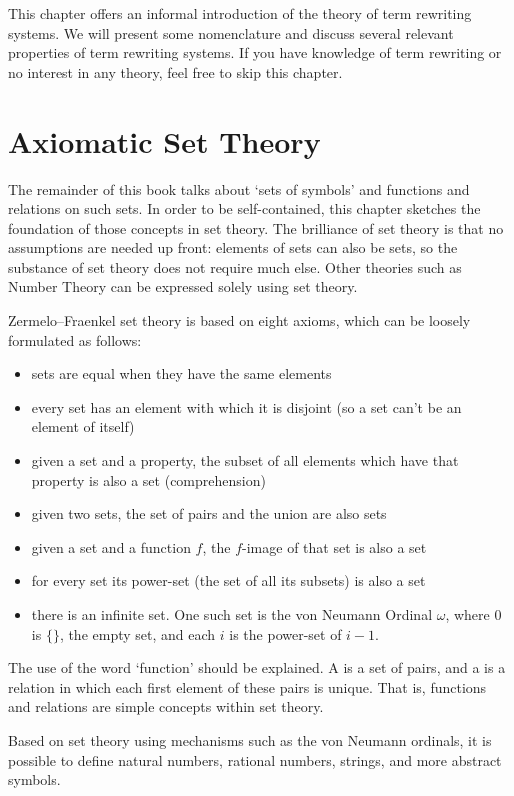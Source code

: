 \documentclass[11pt,twoside]{memoir}
\newcommand{\D}[1]{\index{#1}\defn{#1}}
\begin{document}
This chapter offers an informal introduction of the theory of term rewriting systems. We will present some nomenclature and discuss several relevant properties of term rewriting systems. If you have knowledge of term rewriting or no interest in any theory, feel free to skip this chapter. 

\section{Axiomatic Set Theory}
The remainder of this book talks about `sets of symbols' and functions and relations on such sets. In order to be self-contained, this chapter sketches the foundation of those concepts in set theory. The brilliance of set theory is that no assumptions are needed up front: elements of sets can also be sets, so the substance of set theory does not require much else. Other theories such as Number Theory can be expressed solely using set theory.

Zermelo–Fraenkel set theory is based on eight axioms, which can be loosely formulated as follows:
\begin{itemize}
	\item sets are equal when they have the same elements
	\item every set has an element with which it is disjoint (so a set can't be an element of itself)
	\item given a set and a property, the subset of all elements which have that property is also a set (comprehension)
	\item given two sets, the set of pairs and the union are also sets
	\item given a set and a function $f$, the $f$-image of that set is also a set
	\item for every set its power-set (the set of all its subsets) is also a set
	\item there is an infinite set. One such set is the von Neumann Ordinal $\omega$, where $0$ is $\{\}$, the empty set, and each $i$ is the power-set of $i-1$. 
\end{itemize}

The use of the word `function' should be explained. A \D{relation} is a set of pairs, and a \D{function} is a relation in which each first element of these pairs is unique. That is, functions and relations are simple concepts within set theory.

Based on set theory using mechanisms such as the von Neumann ordinals, it is possible to define natural numbers, rational numbers, strings, and more abstract symbols.
\end{document}
